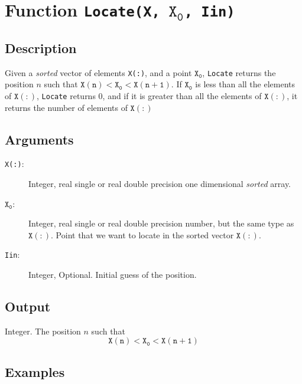 \section{Function \texttt{Locate(X, $\mathtt{X_0}$, Iin)}}

\subsection{Description}

Given a \emph{sorted} vector of elements \texttt{X(:)}, and a point
$\mathtt{X_0}$, \texttt{Locate} returns the position $n$ such that
$\mathtt{X(n)<X_0<X(n+1)}$. If  $\mathtt{X_0}$ is less than all the
elements of $\mathtt{X(:)}$, \texttt{Locate} returns $0$, and if it is
greater than all the elements of $\mathtt{X(:)}$, it returns the
number of elements of $\mathtt{X(:)}$

\subsection{Arguments}

\begin{description}
\item[\texttt{X(:)}: ] Integer, real single or real double precision one
  dimensional \emph{sorted} array. 
\item[$\mathtt{X_0}$: ] Integer, real single or real double precision
  number, but the same type as $\mathtt{X(:)}$. Point that we want to
  locate in the sorted vector $\mathtt{X(:)}$.
\item[\texttt{Iin}: ] Integer, Optional. Initial guess of the position.
\end{description}

\subsection{Output}

Integer. The position $n$ such that 
\begin{displaymath}
  \mathtt{X(n)<X_0<X(n+1)}  
\end{displaymath}

\subsection{Examples}

